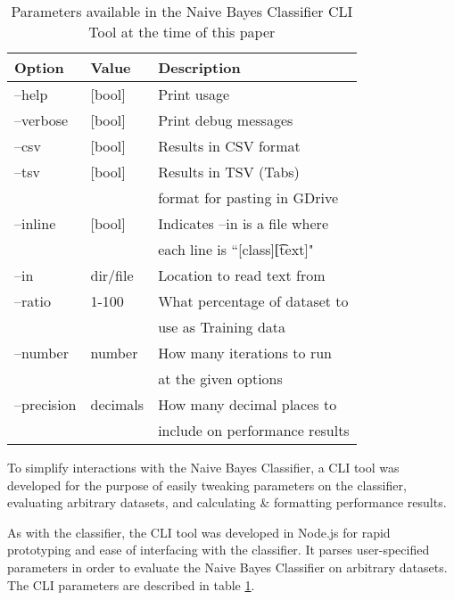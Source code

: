 \begin{table}
    \begin{tabular}{lll}
        \hline
        \textbf{Option} & \textbf{Value} & \textbf{Description} \\ [0.5ex]
        \hline\hline
        --help & [bool] & Print usage \\
        --verbose & [bool] & Print debug messages \\
        --csv & [bool] & Results in CSV format \\
        --tsv & [bool] & Results in TSV (Tabs) \\
              &        & format for pasting in GDrive \\
        --inline & [bool] & Indicates --in is a file where \\
                 &        & each line is ``[class]\t[text]" \\
        --in & dir/file & Location to read text from \\
        --ratio & 1-100 & What percentage of dataset to \\
                &       & use as Training data \\
        --number & number & How many iterations to run \\
                 &        & at the given options \\
        --precision & decimals & How many decimal places to \\
                    &          & include on performance results \\
        \hline
    \end{tabular}
    \caption{Parameters available in the Naive Bayes Classifier CLI Tool at the time of this paper}
    \label{table:cliParams}
\end{table}

To simplify interactions with the Naive Bayes Classifier, a CLI tool was developed for the purpose of easily tweaking
parameters on the classifier, evaluating arbitrary datasets, and calculating \& formatting performance results.

As with the classifier, the CLI tool was developed in Node.js for rapid prototyping and ease of interfacing with the
classifier. It parses user-specified parameters in order to evaluate the Naive Bayes Classifier on arbitrary datasets.
The CLI parameters are described in table \ref{table:cliParams}.
